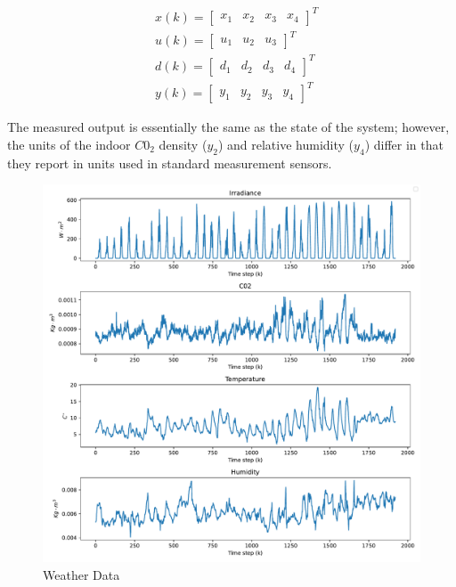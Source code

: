 \begin{equation}
	\begin{aligned}
		& x(k) = \begin{bmatrix}
			x_1 & x_{2} & x_3 & x_4
		\end{bmatrix}^T
		\\
		& u(k) = \begin{bmatrix}
			u_{1} & u_{2} & u_3
		\end{bmatrix}^T
		\\
		& d(k) = \begin{bmatrix}
			d_{1} & d_{2} & d_3& d_4
		\end{bmatrix}^T
		\\
		& y(k) = \begin{bmatrix}
			y_1 & y_{2} & y_3 & y_{4}
		\end{bmatrix}^T
	\end{aligned}
	\label{eq: model vectors}
\end{equation}

The measured output is essentially the same as the state of the system; however, the units of the indoor $C0_2$ density ($y_2$) and relative humidity ($y_4$) differ in that they report in units used in standard measurement sensors.

\begin{figure}[H]
	\centering
	\includegraphics[width=\linewidth]{figures/weather_data_vertical.pdf}
	\caption{Weather Data}
	\label{fig:weather-data}
\end{figure}

